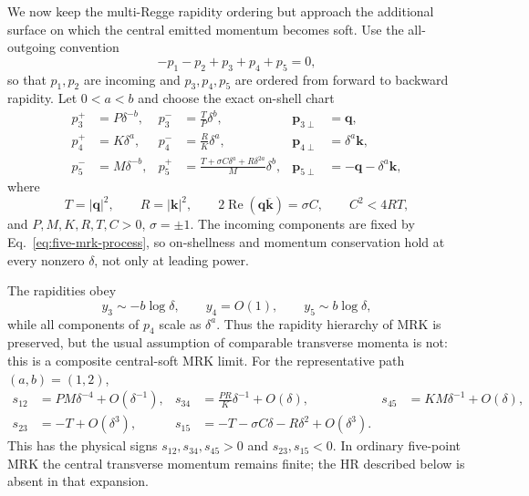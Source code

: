 \documentclass[a4paper,11pt]{article}
\begin{document}
We now keep the multi-Regge rapidity ordering but approach the additional
surface on which the central emitted momentum becomes soft.  Use the
all-outgoing convention
\begin{equation}
 -p_1-p_2+p_3+p_4+p_5=0,
 \label{eq:five-mrk-process}
\end{equation}
so that \(p_1,p_2\) are incoming and \(p_3,p_4,p_5\) are ordered from forward
to backward rapidity.  Let \(0<a<b\) and choose the exact on-shell chart
\begin{align}
 p_3^+&=P\delta^{-b},&
 p_3^-&=\frac{T}{P}\delta^b,&
 \boldsymbol p_{3\perp}&=\boldsymbol q,
 \nonumber\\
 p_4^+&=K\delta^a,&
 p_4^-&=\frac{R}{K}\delta^a,&
 \boldsymbol p_{4\perp}&=\delta^a\boldsymbol k,
 \nonumber\\
 p_5^-&=M\delta^{-b},&
 p_5^+&=\frac{T+\sigma C\delta^a+R\delta^{2a}}{M}\delta^b,&
 \boldsymbol p_{5\perp}&=-\boldsymbol q-\delta^a\boldsymbol k,
 \label{eq:five-mrk-chart}
\end{align}
where
\begin{equation}
 T=|\boldsymbol q|^2,\qquad R=|\boldsymbol k|^2,\qquad
 2\operatorname{Re}(\boldsymbol q\overline{\boldsymbol k})=\sigma C,
 \qquad C^2<4RT,
 \label{eq:five-mrk-domain}
\end{equation}
and \(P,M,K,R,T,C>0\), \(\sigma=\pm1\).  The incoming components are fixed by
Eq.~\eqref{eq:five-mrk-process}, so on-shellness and momentum conservation
hold at every nonzero \(\delta\), not only at leading power.

The rapidities obey
\begin{equation}
 y_3\sim-b\log\delta,\qquad y_4=O(1),\qquad
 y_5\sim b\log\delta,
 \label{eq:five-mrk-rapidities}
\end{equation}
while all components of \(p_4\) scale as \(\delta^a\).  Thus the rapidity
hierarchy of MRK is preserved, but the usual assumption of comparable
transverse momenta is not: this is a composite central-soft MRK limit.
For the representative path \((a,b)=(1,2)\),
\begin{align}
 s_{12}&=PM\delta^{-4}+O(\delta^{-1}),&
 s_{34}&=\frac{PR}{K}\delta^{-1}+O(\delta),&
 s_{45}&=KM\delta^{-1}+O(\delta),
 \nonumber\\
 s_{23}&=-T+O(\delta^3),&
 s_{15}&=-T-\sigma C\delta-R\delta^2+O(\delta^3).
 \label{eq:five-mrk-invariants}
\end{align}
This has the physical signs \(s_{12},s_{34},s_{45}>0\) and
\(s_{23},s_{15}<0\).  In ordinary five-point MRK the central transverse
momentum remains finite; the HR described below is absent in that expansion.
\end{document}
